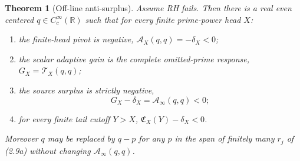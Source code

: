 \documentclass[11pt]{amsart}
\newtheorem{theorem}{Theorem}[section]
\theoremstyle{definition}
\theoremstyle{remark}
\newcommand{\R}{\mathbb R}
\begin{document}
\begin{theorem}[Off-line anti-surplus]
\label{thm:antisurplus}
Assume RH fails.  Then there is a real even centered
\(q\in C_c^\infty(\R)\) such that for every finite prime-power head
\(X\):
\begin{enumerate}
\item the finite-head pivot is negative,
 \(\mathcal A_X(q,q)=-\delta_X<0\);
\item the scalar adaptive gain is the complete omitted-prime response,
 \(G_X=\mathcal T_X(q,q)\);
\item the source surplus is strictly negative,
\[
 \boxed{G_X-\delta_X=\mathcal A_\infty(q,q)<0 ;}
\tag{4.1}
\]
\item for every finite tail cutoff \(Y>X\),
 \(\mathfrak C_X(Y)-\delta_X<0\).
\end{enumerate}
Moreover \(q\) may be replaced by \(q-p\) for any \(p\) in the span of
finitely many \(r_j\) of (2.9a) without changing \(\mathcal A_\infty(q,q)\).
\end{theorem}
\end{document}
